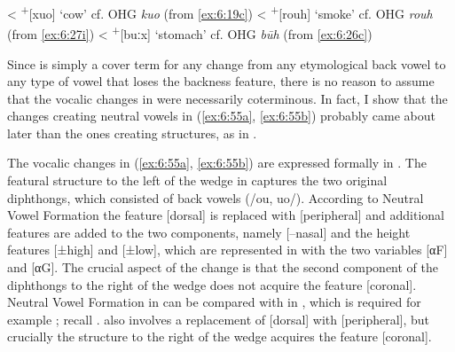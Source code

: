 \ea%
    \label{ex:6:55}
\ea\label{ex:6:55a}\relax [xyo]   \tab < \tab \textsuperscript{+}[xuo]  \tab ‘cow’     \tab cf. OHG \textit{kuo}  \tab (from \ref{ex:6:19c})
\ex\label{ex:6:55b}\relax [røix]  \tab < \tab \textsuperscript{+}[rouh] \tab ‘smoke’   \tab cf. OHG \textit{rouh} \tab (from \ref{ex:6:27i})
\ex\label{ex:6:55c}\relax [byːç]  \tab < \tab \textsuperscript{+}[buːx] \tab ‘stomach’ \tab cf. OHG \textit{būh}  \tab (from \ref{ex:6:26c})
\z 
\z 


Since  is simply a cover term for any change from any etymological back vowel to any type of vowel that loses the backness feature, there is no reason to assume that the vocalic changes in  were necessarily coterminous. In fact, I show that the changes creating neutral vowels in (\ref{ex:6:55a}, \ref{ex:6:55b}) probably came about later than the ones creating  structures, as in .

The vocalic changes in (\ref{ex:6:55a}, \ref{ex:6:55b}) are expressed formally in . The featural structure to the left of the wedge in  captures the two original diphthongs, which consisted of back vowels (/ou, uo/). According to Neutral Vowel Formation the feature [dorsal] is replaced with [peripheral] and additional features are added to the two components, namely [--nasal] and the height features [±high] and [±low], which are represented in  with the two variables [αF] and [αG]. The crucial aspect of the change is that the second component of the diphthongs to the right of the wedge does not acquire the feature [coronal]. Neutral Vowel Formation in  can be compared with  in , which is required for example ; recall .  also involves a replacement of [dorsal] with [peripheral], but crucially the structure to the right of the wedge acquires the feature [coronal].


